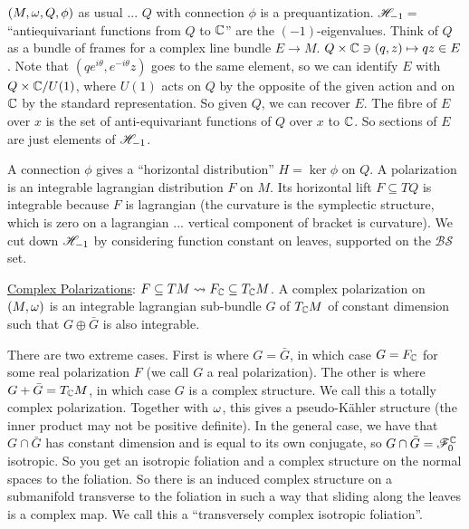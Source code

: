  \def\BS{\mathcal{BS}}

 \setcounter{lecture}{23}

 $(M,\omega,Q,\phi)$ as usual ... $Q$ with connection $\phi$ is a prequantization.
 $\mathscr{H}_{-1}=$ ``antiequivariant functions from $Q$ to $\mathbb{C}$'' are the
 $(-1)$-eigenvalues.  Think of $Q$ as a bundle of frames for a complex line bundle
 $E\to M$.  $Q\times \mathbb{C}\ni (q,z)\mapsto qz\in E$.  Note that
 $(qe^{i\theta},e^{-i\theta}z)$ goes to the same element, so we can identify $E$ with
 $Q\times \mathbb{C}/U(1)$, where $U(1)$ acts on $Q$ by the opposite of the given action and
 on $\mathbb{C}$ by the standard representation.  So given $Q$, we can recover $E$. The fibre
 of $E$ over $x$ is the set of anti-equivariant functions of $Q$ over $x$ to $\mathbb{C}$.
 So sections of $E$ are just elements of $\mathscr{H}_{-1}$.

 A connection $\phi$ gives a ``horizontal distribution'' $H=\ker\phi$ on $Q$.  A
 polarization is an integrable lagrangian distribution $F$ on $M$.  Its horizontal
 lift $F\subseteq TQ$ is integrable because $F$ is lagrangian (the curvature is the
 symplectic structure, which is zero on a lagrangian ... vertical component of bracket
 is curvature).  We cut down $\mathscr{H}_{-1}$ by considering function constant on leaves,
 supported on the $\BS$ set.

 \underline{Complex Polarizations}: $F\subseteq TM \rightsquigarrow F_{\mathbb{C}}\subseteq
 T_{\mathbb{C}} M$.  A complex polarization on $(M,\omega)$ is an integrable lagrangian sub-bundle
 $G$ of $T_{\mathbb{C}} M$ of constant dimension such that $G\oplus \bar G$ is also integrable.

 There are two extreme cases.  First is where $G=\bar G$, in which case $G=F_{\mathbb{C}}$ for
 some real polarization $F$ (we call $G$ a real polarization).  The other is where $G+
 \bar G=T_{\mathbb{C}} M$, in which case $G$ is a complex structure.  We call this a totally
 complex polarization.  Together with $\omega$, this gives a pseudo-K\"ahler structure
 (the inner product may not be positive definite). In the general case, we have that
 $G\cap \bar G$ has constant dimension and is equal to its own conjugate, so
 $G\cap\bar G=\mathscr{F}^{\mathbb{C}}_0$ isotropic.  So you get an isotropic foliation and a complex
 structure on the normal spaces to the foliation. So there is an induced complex
 structure on a submanifold transverse to the foliation in such a way that sliding
 along the leaves is a complex map. We call this a ``transversely complex isotropic
 foliation''.

